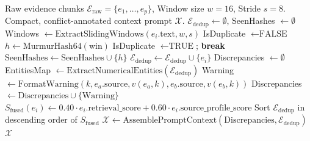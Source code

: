 \begin{algorithm}[h]
\caption{Multi-Source Evidence Fusion and Numerical Conflict Mitigation}
\label{alg:evidence_fusion}
\begin{algorithmic}[1]
\REQUIRE Raw evidence chunks $\mathcal{E}_{\text{raw}} = \{e_1, \dots, e_p\}$, Window size $w = 16$, Stride $s = 8$.
\ENSURE Compact, conflict-annotated context prompt $\mathcal{X}$.
\STATE {}
\STATE $\mathcal{E}_{\text{dedup}} \leftarrow \emptyset$, SeenHashes $\leftarrow \emptyset$
    \STATE Windows $\leftarrow \text{ExtractSlidingWindows}(e_i.\text{text}, w, s)$
    \STATE IsDuplicate $\leftarrow \text{FALSE}$
        \STATE $h \leftarrow \text{MurmurHash64}(\text{win})$
            \STATE IsDuplicate $\leftarrow \text{TRUE}$; \textbf{break}
        \ENDIF
        \STATE $\text{SeenHashes} \leftarrow \text{SeenHashes} \cup \{h\}$
    \ENDFOR
        \STATE $\mathcal{E}_{\text{dedup}} \leftarrow \mathcal{E}_{\text{dedup}} \cup \{e_i\}$
    \ENDIF
\ENDFOR
\STATE {}
\STATE Discrepancies $\leftarrow \emptyset$
\STATE EntitiesMap $\leftarrow \text{ExtractNumericalEntities}(\mathcal{E}_{\text{dedup}})$
            \STATE Warning $\leftarrow \text{FormatWarning}(k, e_a.\text{source}, v(e_a, k), e_b.\text{source}, v(e_b, k))$
            \STATE Discrepancies $\leftarrow \text{Discrepancies} \cup \{\text{Warning}\}$
        \ENDIF
    \ENDFOR
\ENDFOR
\STATE {}
    \STATE $S_{\text{fused}}(e_i) \leftarrow 0.40 \cdot e_i.\text{retrieval\_score} + 0.60 \cdot e_i.\text{source\_profile\_score}$
\ENDFOR
\STATE Sort $\mathcal{E}_{\text{dedup}}$ in descending order of $S_{\text{fused}}$
\STATE $\mathcal{X} \leftarrow \text{AssemblePromptContext}(\text{Discrepancies}, \mathcal{E}_{\text{dedup}})$
\RETURN $\mathcal{X}$
\end{algorithmic}
\end{algorithm}
